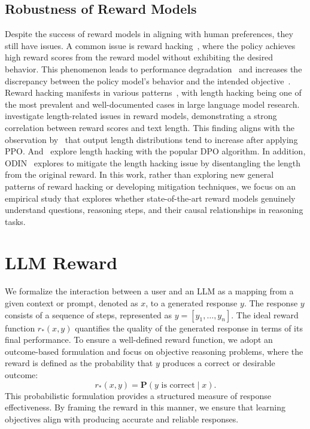 \documentclass{article}
\begin{document}
\subsection{Robustness of Reward Models}
Despite the success of reward models in aligning with human preferences, they still have issues. A common issue is reward hacking~\citep{ibarz2018reward, denison2024sycophancy}, where the policy achieves high reward scores from the reward model without exhibiting the desired behavior. This phenomenon leads to performance degradation~\citep{bai2022training} and increases the discrepancy between the policy model's behavior and the intended objective~\citep{stienon2020learning}. 
Reward hacking manifests in various patterns~\citep{park2024offsetbias}, with length hacking being one of the most prevalent and well-documented cases in large language model research.~\citet{singhal2024long} investigate length-related issues in reward models, demonstrating a strong correlation between reward scores and text length. This finding aligns with the observation by~\citet{dubois2023alpacafarm} that output length distributions tend to increase after applying PPO. And~\citet{liu2024iterative} explore length hacking with the popular DPO algorithm. In addition, ODIN~\citep{denison2024sycophancy} explores to mitigate the length hacking issue by disentangling the length from the original reward.
In this work, rather than exploring new general patterns of reward hacking or developing mitigation techniques, we focus on an empirical study that explores whether state-of-the-art reward models genuinely understand questions, reasoning steps, and their causal relationships in reasoning tasks.



\section{LLM Reward}

We formalize the interaction between a user and an LLM as a mapping from a given context or prompt, denoted as \( x \), to a generated response \( y \). The response \( y \) consists of a sequence of steps, represented as \( y = [y_1, \dots, y_n] \). The ideal reward function \( r_*(x, y) \) quantifies the quality of the generated response in terms of its final performance. To ensure a well-defined reward function, we adopt an outcome-based formulation and focus on objective reasoning problems, where the reward is defined as the probability that \( y \) produces a correct or desirable outcome:
\[
r_*(x, y) = \textbf{P}(y\text{ is correct} \mid x).
\]
This probabilistic formulation provides a structured measure of response effectiveness. By framing the reward in this manner, we ensure that learning objectives align with producing accurate and reliable responses.
\end{document}
